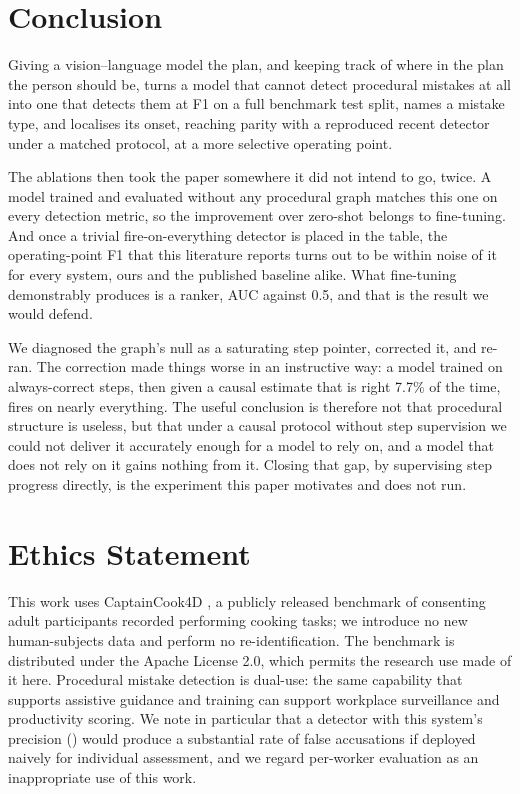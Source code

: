 \documentclass[10pt,twocolumn]{article}
\begin{document}
\section{Conclusion}

Giving a vision--language model the plan, and keeping track of
where in the plan the person should be, turns a model that cannot detect
procedural mistakes at all into one that detects them at \resF{} F1 on a full
benchmark test split, names a mistake type, and localises its onset, reaching
parity with a reproduced recent detector under a matched protocol, at a more
selective operating point.

The ablations then took the paper somewhere it did not intend to go, twice. A
model trained and evaluated without any procedural graph matches this one on
every detection metric, so the improvement over zero-shot belongs to
fine-tuning. And once a trivial fire-on-everything detector is placed in the
table, the operating-point F1 that this literature reports turns out to be
within noise of it for every system, ours and the published baseline alike.
What fine-tuning demonstrably produces is a ranker, AUC \resAUC{} against 0.5,
and that is the result we would defend.

We diagnosed the graph's null as a saturating step pointer, corrected it, and
re-ran. The correction made things worse in an instructive way: a model trained
on always-correct steps, then given a causal estimate that is right 7.7\% of
the time, fires on nearly everything. The useful conclusion is therefore not
that procedural structure is useless, but that under a causal protocol without
step supervision we could not deliver it accurately enough for a model to rely
on, and a model that does not rely on it gains nothing from it. Closing that
gap, by supervising step progress directly, is the experiment this paper
motivates and does not run.

\section*{Ethics Statement}
This work uses CaptainCook4D \citep{peddi2024captaincook4d}, a publicly released
benchmark of consenting adult participants recorded performing cooking tasks; we
introduce no new human-subjects data and perform no re-identification. The
benchmark is distributed under the Apache License 2.0, which permits the research
use made of it here. Procedural
mistake detection is dual-use: the same capability that supports assistive
guidance and training can support workplace surveillance and productivity
scoring. We note in particular that a detector with this system's precision
(\resP{}) would produce a substantial rate of false accusations if deployed
naively for individual assessment, and we regard per-worker evaluation as an
inappropriate use of this work.
\end{document}
